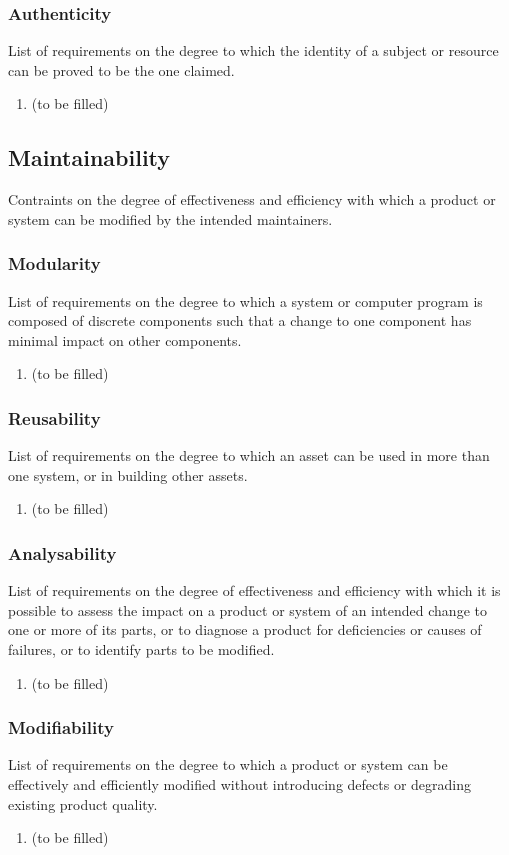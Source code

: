 \subsubsection{Authenticity}
List of requirements on the degree to which the identity of a subject or resource can be proved to be the one claimed.
\begin{enumerate}
\item (to be filled)
\end{enumerate}


\subsection{Maintainability}
Contraints on the degree of effectiveness and efficiency with which a product or system can be modified by the intended maintainers.
\subsubsection{Modularity}
List of requirements on the degree to which a system or computer program is composed of discrete components such that a change to one component has minimal impact on other components.
\begin{enumerate}
\item (to be filled)
\end{enumerate}
\subsubsection{Reusability}
List of requirements on the degree to which an asset can be used in more than one system, or in building other assets.
\begin{enumerate}
\item (to be filled)
\end{enumerate}
\subsubsection{Analysability}
List of requirements on the degree of effectiveness and efficiency with which it is possible to assess the impact on a product or system of an intended change to one or more of its parts, or to diagnose a product for deficiencies or causes of failures, or to identify parts to be modified.
\begin{enumerate}
\item (to be filled)
\end{enumerate}
\subsubsection{Modifiability}
List of requirements on the degree to which a product or system can be effectively and efficiently modified without introducing defects or degrading existing product quality.
\begin{enumerate}
\item (to be filled)
\end{enumerate}
